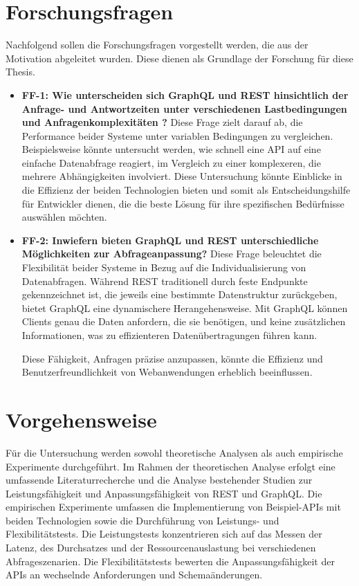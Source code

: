 \newpage
\section{Forschungsfragen} %
\label{sec:forschungsfragen}
Nachfolgend sollen die Forschungsfragen vorgestellt werden, die aus der Motivation abgeleitet wurden. Diese dienen als Grundlage der Forschung für diese Thesis.
\begin{itemize}
	\item \textbf{FF-1: Wie unterscheiden sich GraphQL und REST hinsichtlich der Anfrage- und Antwortzeiten unter verschiedenen Lastbedingungen und Anfragenkomplexitäten ?}  Diese Frage zielt darauf ab, die Performance beider Systeme unter variablen Bedingungen zu vergleichen. Beispielsweise könnte untersucht werden, wie schnell eine API auf eine einfache Datenabfrage reagiert, im Vergleich zu einer komplexeren, die mehrere Abhängigkeiten involviert. Diese Untersuchung könnte Einblicke in die Effizienz der beiden Technologien bieten und somit als Entscheidungshilfe für Entwickler dienen, die die beste Lösung für ihre spezifischen Bedürfnisse auswählen möchten.
	\item \textbf{FF-2: Inwiefern bieten GraphQL und REST unterschiedliche Möglichkeiten zur Abfrageanpassung?} Diese Frage beleuchtet die Flexibilität beider Systeme in Bezug auf die Individualisierung von Datenabfragen. Während REST traditionell durch feste Endpunkte gekennzeichnet ist, die jeweils eine bestimmte Datenstruktur zurückgeben, bietet GraphQL eine dynamischere Herangehensweise. Mit GraphQL können Clients genau die Daten anfordern, die sie benötigen, und keine zusätzlichen Informationen, was zu effizienteren Datenübertragungen führen kann. 

Diese Fähigkeit, Anfragen präzise anzupassen, könnte die Effizienz und Benutzerfreundlichkeit von Webanwendungen erheblich beeinflussen.
\end{itemize}

\section{Vorgehensweise} %
\label{sec:vorgehensweise}

Für die Untersuchung werden sowohl theoretische Analysen als auch empirische Experimente durchgeführt. Im Rahmen der theoretischen Analyse erfolgt eine umfassende Literaturrecherche und die Analyse bestehender Studien zur Leistungsfähigkeit und Anpassungsfähigkeit von REST und GraphQL. Die empirischen Experimente umfassen die Implementierung von Beispiel-APIs mit beiden Technologien sowie die Durchführung von Leistungs- und Flexibilitätstests. Die Leistungstests konzentrieren sich auf das Messen der Latenz, des Durchsatzes und der Ressourcenauslastung bei verschiedenen Abfrageszenarien. Die Flexibilitätstests bewerten die Anpassungsfähigkeit der APIs an wechselnde Anforderungen und Schemaänderungen.


